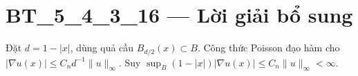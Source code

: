 \documentclass[10pt,a4paper]{article}
\begin{document}
\section*{BT\_5\_4\_3\_16 — Lời giải bổ sung}
Đặt $d=1-|x|$, dùng quả cầu $B_{d/2}(x)\subset B$. Công thức Poisson đạo hàm cho $|\nabla u(x)|\le C_nd^{-1}\|u\|_\infty$. Suy $\sup_B(1-|x|)|\nabla u(x)|\le C_n\|u\|_\infty<\infty$.
\end{document}
